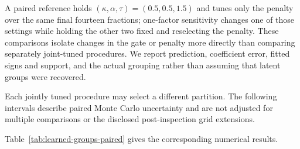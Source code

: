 \documentclass[11pt,a4paper]{article}
\begin{document}
A paired reference holds $(\kappa,\alpha,\tau)=(0.5,0.5,1.5)$ and tunes only
the penalty over the same final fourteen fractions; one-factor sensitivity
changes one of those settings while holding the other two fixed and reselecting
the penalty. These comparisons isolate changes in the gate or penalty
more directly than comparing separately joint-tuned procedures. We report
prediction, coefficient error, fitted signs and support, and the actual grouping
rather than assuming that latent groups were recovered.

Each jointly tuned procedure may select a different partition. The following
intervals describe paired Monte Carlo uncertainty and are not adjusted for
multiple comparisons or the disclosed post-inspection grid extensions.

\noindent Table~\ref{tab:learned-groups-paired} gives the corresponding numerical results.

\begin{table}[htbp]
\centering\small
\caption{Grouping diagnostics at the fixed reference cut and paired prediction differences for jointly tuned procedures. ARI compares learned groups with the designed anchor partition. Opposite active pairs is the fraction of within-learned-group response--predictor pairs with two nonzero coefficients of opposite signs. The final column is pooled-exclusion HCGL minus unconstrained HCGL standardized test MSE, with a paired $t_{39}$ interval; its independently tuned partitions need not match those underlying the first three columns.}
\label{tab:learned-groups-paired}
\end{table}
\end{document}
